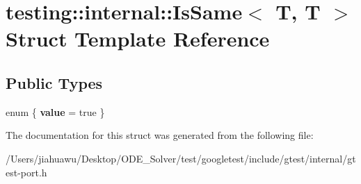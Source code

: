 \hypertarget{structtesting_1_1internal_1_1_is_same_3_01_t_00_01_t_01_4}{}\section{testing\+:\+:internal\+:\+:Is\+Same$<$ T, T $>$ Struct Template Reference}
\label{structtesting_1_1internal_1_1_is_same_3_01_t_00_01_t_01_4}
\subsection*{Public Types}
\begin{DoxyCompactItemize}
\item 
\mbox{\label{structtesting_1_1internal_1_1_is_same_3_01_t_00_01_t_01_4_a4f43bdb63adfd73e0a8cace4cc6368de}} 
enum \{ {\bfseries value} = true
 \}
\end{DoxyCompactItemize}


The documentation for this struct was generated from the following file\+:\begin{DoxyCompactItemize}
\item 
/\+Users/jiahuawu/\+Desktop/\+O\+D\+E\+\_\+\+Solver/test/googletest/include/gtest/internal/gtest-\/port.\+h\end{DoxyCompactItemize}

